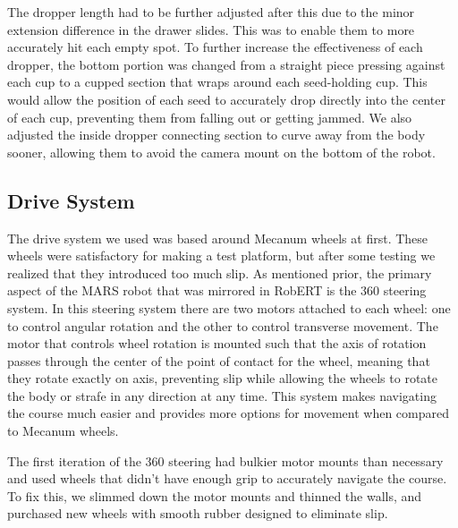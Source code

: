 \documentclass[11pt, hidelinks]{report}
\begin{document}
The dropper length had to be further adjusted after this due to the minor extension difference in the drawer slides.  This was to enable them to more accurately hit each empty spot. To further increase the effectiveness of each dropper, the bottom portion was changed from a straight piece pressing against each cup to a cupped section that wraps around each seed-holding cup.  This would allow the position of each seed to accurately drop directly into the center of each cup, preventing them from falling out or getting jammed.  We also adjusted the inside dropper connecting section to curve away from the body sooner, allowing them to avoid the camera mount on the bottom of the robot.

\subsection{Drive System}
The drive system we used was based around Mecanum wheels at first. These wheels were satisfactory for making a test platform, but after some testing we realized that they introduced too much slip.  As mentioned prior, the primary aspect of the MARS robot that was mirrored in RobERT is the {360\textdegree} steering system. In this steering system there are two motors attached to each wheel: one to control angular rotation and the other to control transverse movement.  The motor that controls wheel rotation is mounted such that the axis of rotation passes through the center of the point of contact for the wheel, meaning that they rotate exactly on axis, preventing slip while allowing the wheels to rotate the body or strafe in any direction at any time.  This system makes navigating the course much easier and provides more options for movement when compared to Mecanum wheels.

The first iteration of the {360\textdegree} steering had bulkier motor mounts than necessary and used wheels that didn't have enough grip to accurately navigate the course. To fix this, we slimmed down the motor mounts and thinned the walls, and purchased new wheels with smooth rubber designed to eliminate slip.  
\end{document}
